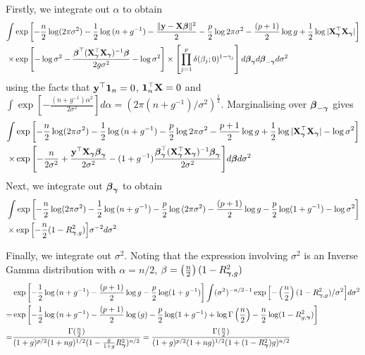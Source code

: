 \documentclass{amsart}[12pt]
\theoremstyle{definition}
\begin{document}
\noindent Firstly, we integrate out $\alpha$ to obtain
\begin{align*}
		\int & \exp{\left[-\frac{n}{2} \log (2 \pi \sigma^2) - \frac{1}{2} \log{(n + g^{-1})} - \frac{\|{\bf y}- {\bf X}{\boldsymbol\beta}\|^2}{2} 
		-\frac{p}{2} \log{2\pi \sigma^2} - \frac{(p + 1)}{2} \log{g} + \frac{1}{2} \log{|{\bf X}_{\boldsymbol\gamma}^\top {\bf X}_{\boldsymbol\gamma}|} \right]}\\
		\times&\exp{\left[- \log{\sigma^2} - \frac{{\boldsymbol\beta}^\top ({\bf X}_{\boldsymbol\gamma}^\top {\bf X}_{\boldsymbol\gamma})^{-1} {\boldsymbol\beta}}{2 g \sigma^{2}} - \log{\sigma^2}\right]} 
		\times \left[ \prod_{j=1}^p \delta(\beta_j; 0)^{1 - \gamma_j} \right] d {\boldsymbol \beta}_{{\boldsymbol \gamma}} d {\boldsymbol \beta}_{-{\boldsymbol \gamma}} d \sigma^2
\end{align*}
using the facts that ${\bf y}^\top {\bf1}_n = 0$, ${\bf 1}_n^\top {\bf X} = 0$ and $\int \exp{\left[-\frac{(n + g^{-1})\alpha^2}{2 \sigma^{2}} \right]} d \alpha = (2 \pi (n + g^{-1}) / \sigma^{2})^{\frac{1}{2}}$.
Marginalising over ${\boldsymbol \beta}_{-{\boldsymbol \gamma}}$ gives
\begin{align*}
		\int &\exp{\left[-\frac{n}{2} \log (2 \pi \sigma^2) - \frac{1}{2} \log{(n + g^{-1})}
		-\frac{p}{2} \log{2\pi \sigma^2} - \frac{p + 1}{2} \log{g}
		+ \frac{1}{2} \log{|{\bf X}_{\boldsymbol\gamma}^\top {\bf X}_{\boldsymbol\gamma}|} - \log{\sigma^2} \right]} \\
		\times&\exp{\left[- \frac{n}{2 \sigma^2}+ \frac{{\bf y}^\top{\bf X}_{\boldsymbol\gamma}{\boldsymbol\beta}_{\boldsymbol\gamma}}{2 \sigma^2} - (1 + g^{-1})\frac{{\boldsymbol\beta}_{\boldsymbol\gamma}^\top ({\bf X}_{\boldsymbol\gamma}^\top {\bf X}_{\boldsymbol\gamma})^{-1} {\boldsymbol\beta}_{\boldsymbol\gamma}}{2 \sigma^{2}} \right]} d {\boldsymbol \beta} d \sigma^2
\end{align*}
\noindent Next, we integrate out ${\boldsymbol \beta}_{{\boldsymbol \gamma}}$ to obtain
\begin{align*}
		& \int \exp{\left[-\frac{n}{2} \log (2 \pi \sigma^2) - \frac{1}{2} \log{(n + g^{-1})}
		-\frac{p}{2} \log{(2\pi \sigma^2)} - \frac{(p + 1)}{2} \log{g} - \frac{p}{2} \log (1 + g^{-1}) -\log{\sigma^2} \right]} \\
		&\times \exp{\left[-\frac{n}{2} (1 - R^2_{{\boldsymbol\gamma}, g})\right]} \sigma^{-2}
		d \sigma^2
\end{align*}

\noindent Finally, we integrate out $\sigma^2$. Noting that the expression involving $\sigma^2$ is an
Inverse Gamma distribution with $\alpha = n/2$, $\beta = \left(\frac{n}{2}\right) (1 - R^2_{{\boldsymbol \gamma}, g})$
\begin{align*}
		& \exp{\left[- \frac{1}{2} \log{(n + g^{-1})}
		- \frac{(p + 1)}{2} \log{g} - \frac{p}{2} \log (1 + g^{-1}) \right]}
		 \int (\sigma^{2})^{-n/2 - 1} \exp{\left[-\left(\frac{n}{2}\right) (1 - R^2_{{\boldsymbol\gamma}, g}) / \sigma^{2}\right]} d \sigma^2 \\
		= &\exp{\left[- \frac{1}{2} \log{(n + g^{-1})}
		- \frac{(p + 1)}{2} \log{(g)} - \frac{p}{2} \log (1 + g^{-1})
		+ \log \Gamma\left(\frac{n}{2}\right) - \frac{n}{2} \log(1 - R^2_{g, {\boldsymbol\gamma}}) \right]} \\
		= &\frac{\Gamma(\frac{n}{2})}{(1 + g)^{p/2} (1 + ng)^{1/2} (1 - \frac{g}{1 + g} R^2_{\boldsymbol \gamma})^{n/2}}
		= \frac{\Gamma(\frac{n}{2})}{(1 + g)^{p/2} (1 + ng)^{1/2} (1 + (1 - R^2_{\boldsymbol \gamma}) g)^{n/2}}
\end{align*}
\end{document}
